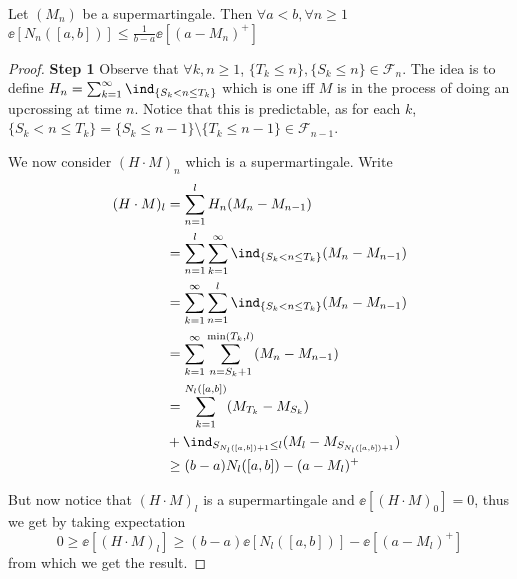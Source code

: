 \documentclass[../main.tex]{subfiles}
\begin{document}
\begin{lemma}
  Let $(M_n)$ be a supermartingale. Then $\forall a < b, \forall n \geq 1$
  $\ee[N_n([a, b])] \leq \frac{1}{b - a} \ee[(a - M_n)^+] $
\end{lemma}
\begin{proof}
    \hfill

    \noindent\textbf{\sffamily Step 1}
    Observe that $\forall k, n \geq 1$, $\{ T_k \leq n \}, \{ S_k \leq n \} \in
    \mathcal{F}_n$. The idea is to define $H_n = \sum_{k=1}^\infty \ind_{\{ S_k
    < n \leq T_k\} }$ which is one iff $M$ is in the process of doing an
    upcrossing at time $n$. Notice that this is predictable, as for each $k$,
    $\{ S_k < n \leq T_k \} = \{ S_k \leq n-1 \} \setminus \{ T_k \leq n-1 \}
    \in \mathcal{F}_{n-1}$.

    We now consider $(H \cdot M)_n$ which is a supermartingale. Write
    \begin{align*}
      (H \cdot M)_l &= 
          \sum_{n=1}^l H_n (M_n - M_{n-1}) \\
          &= \sum_{n=1}^l \sum_{k=1}^\infty \ind_{\{ S_k < n \leq T_k \} } (M_n -
          M_{n - 1}) \\
          &=
          \sum_{k=1}^\infty\sum_{n=1}^l  \ind_{\{ S_k < n \leq T_k \} } (M_n -
          M_{n - 1}) \\
          &= \sum_{k=1}^\infty \sum_{n=S_k + 1}^{\min(T_k, l)} (M_n - M_{n - 1})
          \\
          &= \sum_{k = 1}^{N_l([a, b])} (M_{T_k} - M_{S_k}) \\ 
          &+ \ind_{S_{N_l([a,
          b]) + 1}\leq l}(M_l - M_{S_{N_l([a, b]) + 1}}) \\
          &\geq (b - a) N_{l}([a, b]) - (a - M_l)^+
    \end{align*}

    But now notice that $(H \cdot M)_l$ is a supermartingale and $\ee[(H \cdot
    M)_0] = 0$, thus we get by taking expectation
    \[
      0 \geq \ee[(H \cdot M)_l] \geq (b-a) \ee[N_l([a, b])] - \ee[(a - M_l)^+]
    \]
    from which we get the result.
\end{proof}
\end{document}
